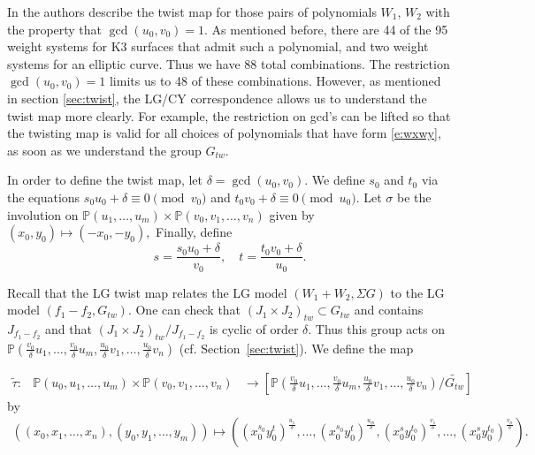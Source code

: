 \documentclass[10pt, letterpaper]{amsart}
\theoremstyle{remark}
\newcommand{\tw}[1]{{#1}_{tw}}
\newcommand{\s}[1]{\Sigma #1}
\begin{document}
In \cite{ABS} the authors describe the twist map for those pairs of polynomials $W_1$, $W_2$ with the property that $\gcd(u_0,v_0)=1$. As mentioned before, there are 44 of the 95 weight systems for K3 surfaces that admit such a polynomial, and two weight systems for an elliptic curve. Thus we have 88 total combinations. The restriction $\gcd(u_0,v_0)=1$ limits us to 48 of these combinations. However, as mentioned in section \ref{sec:twist}, the LG/CY correspondence allows us to understand the twist map more clearly. For example, the restriction on gcd's can be lifted so that the twisting map is valid for all choices of polynomials that have form \eqref{e:wxwy}, as soon as we understand the group $\tw{G}$. 

In order to define the twist map, let $\delta=\gcd(u_0,v_0)$. We define $s_0$ and $t_0$ via the equations $s_0u_0+\delta\equiv 0\pmod {v_0}$ and $t_0v_0+\delta\equiv 0\pmod {u_0}$. Let $\sigma$ be the involution on $\mathbb{P}(u_1, \ldots, u_m) \times \mathbb{P}(v_0, v_1, \ldots, v_n)$ given by $(x_0, y_0) \mapsto (-x_0, -y_0),$ 
Finally, define 
\[
s=\frac{s_0u_0+\delta}{v_0},\quad t=\frac{t_0v_0+\delta}{u_0}.
\]

Recall that the LG twist map relates the LG model $(W_1+W_2,\s{G})$ to the LG model $(f_1-f_2,\tw{G})$. One can check that $\tw{(J_1\times J_2)}\subset \tw{G}$ and contains $J_{f_1-f_2}$ and that $\tw{(J_1\times J_2)}/J_{f_1-f_2}$ is cyclic of order $\delta$. Thus this group acts on $\mathbb{P}(\frac{v_0}{\delta}u_1, \ldots, \frac{v_0}{\delta} u_m, \frac{u_0}{\delta}v_1, \ldots, \frac{u_0}{\delta}v_n)$ (cf. Section~\ref{sec:twist}). We define the map


\begin{align*}
\tilde{\tau}: & \mathbb{P}(u_0, u_1, \ldots, u_m) \times \mathbb{P}(v_0, v_1, \ldots, v_n) %
& \to [\mathbb{P}(\frac{v_0}{\delta}u_1, \ldots, \frac{v_0}{\delta} u_m, \frac{u_0}{\delta}v_1, \ldots, \frac{u_0}{\delta}v_n)/\widetilde{\tw{G}}]
\end{align*} 
by 
\begin{align*}
((x_0, x_1, \ldots, x_n), (y_0, y_1, \ldots, y_m)) \mapsto ((x_0^{s_0}y_0^t)^{\frac{u_1}{\delta}}, \ldots, (x_0^{s_0}y_0^t)^{\frac{u_m}{\delta}}, (x_0^sy_0^{t_0})^{\frac{v_1}{\delta}}, \ldots, (x_0^sy_0^{t_0})^{\frac{v_n}{\delta}}).
\end{align*} 
\end{document}
